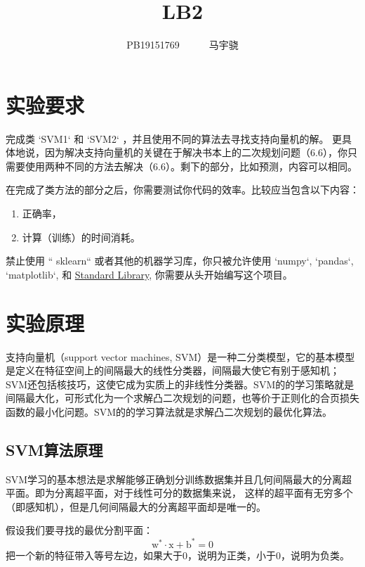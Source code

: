 \documentclass[UTF8,a4paper,AutoFakeBold,AutoFakeSlant]{article}
\title{\textbf{\textsf{{\textsf{LB2} \heiti{机器学习概论}}}}}
\author{\ssong PB19151769~~~~~~马宇骁}
\date{}
\begin{document}
\maketitle

\tableofcontents
\newpage



\section{实验要求}

完成类 `SVM1` 和 `SVM2` ，并且使用不同的算法去寻找支持向量机的解。 更具体地说，因为解决支持向量机的关键在于解决书本上的二次规划问题（6.6），你只需要使用两种不同的方法去解决（6.6）。剩下的部分，比如预测，内容可以相同。

在完成了类方法的部分之后，你需要测试你代码的效率。比较应当包含以下内容：

\begin{enumerate}
  \item 正确率，
  \item 计算（训练）的时间消耗。
\end{enumerate}

禁止使用 `` sklearn`` 或者其他的机器学习库，你只被允许使用 `numpy`, `pandas`, `matplotlib`, 和 \href{https://gitee.com/link?target=https%3A%2F%2Fdocs.python.org%2F3%2Flibrary%2Findex.html}{Standard Library}, 你需要从头开始编写这个项目。




\section{实验原理}

支持向量机（support vector machines, SVM）是一种二分类模型，它的基本模型是定义在特征空间上的间隔最大的线性分类器，间隔最大使它有别于感知机；SVM还包括核技巧，这使它成为实质上的非线性分类器。SVM的的学习策略就是间隔最大化，可形式化为一个求解凸二次规划的问题，也等价于正则化的合页损失函数的最小化问题。SVM的的学习算法就是求解凸二次规划的最优化算法。


\subsection{SVM算法原理}

SVM学习的基本想法是求解能够正确划分训练数据集并且几何间隔最大的分离超平面。即为分离超平面，对于线性可分的数据集来说，
这样的超平面有无穷多个（即感知机），但是几何间隔最大的分离超平面却是唯一的。

假设我们要寻找的最优分割平面：
\begin{equation*}
  \mathrm{w}^{*} \cdot \mathrm{x}+\mathrm{b}^{*}=0
\end{equation*}
把一个新的特征带入等号左边，如果大于0，说明为正类，小于0，说明为负类。
\end{document}
